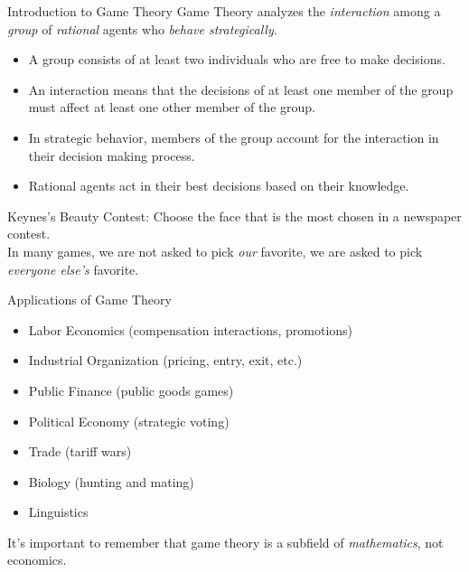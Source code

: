 \documentclass[8pt]{extarticle}
\title{}
\author{Avinash Iyer}
\date{}
\begin{document}
  \begin{problem}{Introduction to Game Theory}
    Game Theory analyzes the \textit{interaction} among a \textit{group} of \textit{rational} agents who \textit{behave strategically}.
    \begin{itemize}
      \item A group consists of at least two individuals who are free to make decisions.
      \item An interaction means that the decisions of at least one member of the group must affect at least one other member of the group.
      \item In strategic behavior, members of the group account for the interaction in their decision making process.
      \item Rational agents act in their best decisions based on their knowledge.
    \end{itemize}
    Keynes's Beauty Contest: Choose the face that is the most chosen in a newspaper contest.\\

    In many games, we are not asked to pick \textit{our} favorite, we are asked to pick \textit{everyone else's} favorite.
    \begin{problem}{Applications of Game Theory}
      \begin{itemize}
        \item Labor Economics (compensation interactions, promotions)
        \item Industrial Organization (pricing, entry, exit, etc.)
        \item Public Finance (public goods games)
        \item Political Economy (strategic voting)
        \item Trade (tariff wars)
        \item Biology (hunting and mating)
        \item Linguistics
      \end{itemize}
    \end{problem}
    It's important to remember that game theory is a subfield of \textit{mathematics}, not economics.
  \end{problem}
\end{document}
